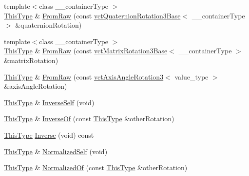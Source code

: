 \begin{DoxyCompactItemize}
\item 
{\footnotesize template$<$class \+\_\+\+\_\+container\+Type $>$ }\\\hyperlink{classvct_rodriguez_rotation3_base_add2bccab7f6e86c98b3f97fd00b06dcc}{This\+Type} \& \hyperlink{classvct_rodriguez_rotation3_base_abbc21c467e3e8ad692236b380cbdc0f3}{From\+Raw} (const \hyperlink{classvct_quaternion_rotation3_base}{vct\+Quaternion\+Rotation3\+Base}$<$ \+\_\+\+\_\+container\+Type $>$ \&quaternion\+Rotation)
\item 
{\footnotesize template$<$class \+\_\+\+\_\+container\+Type $>$ }\\\hyperlink{classvct_rodriguez_rotation3_base_add2bccab7f6e86c98b3f97fd00b06dcc}{This\+Type} \& \hyperlink{classvct_rodriguez_rotation3_base_a41b93f472a3bac59d5057f7a44476929}{From\+Raw} (const \hyperlink{classvct_matrix_rotation3_base}{vct\+Matrix\+Rotation3\+Base}$<$ \+\_\+\+\_\+container\+Type $>$ \&matrix\+Rotation)
\item 
\hyperlink{classvct_rodriguez_rotation3_base_add2bccab7f6e86c98b3f97fd00b06dcc}{This\+Type} \& \hyperlink{classvct_rodriguez_rotation3_base_ac21764b5558150331c617e998f5cc5dd}{From\+Raw} (const \hyperlink{classvct_axis_angle_rotation3}{vct\+Axis\+Angle\+Rotation3}$<$ value\+\_\+type $>$ \&axis\+Angle\+Rotation)
\item 
\hyperlink{classvct_rodriguez_rotation3_base_add2bccab7f6e86c98b3f97fd00b06dcc}{This\+Type} \& \hyperlink{classvct_rodriguez_rotation3_base_af08edcc08dee7bb319d0a4fa836fc1ff}{Inverse\+Self} (void)
\item 
\hyperlink{classvct_rodriguez_rotation3_base_add2bccab7f6e86c98b3f97fd00b06dcc}{This\+Type} \& \hyperlink{classvct_rodriguez_rotation3_base_a7e99a6439a25aecdf538af69a2277be3}{Inverse\+Of} (const \hyperlink{classvct_rodriguez_rotation3_base_add2bccab7f6e86c98b3f97fd00b06dcc}{This\+Type} \&other\+Rotation)
\item 
\hyperlink{classvct_rodriguez_rotation3_base_add2bccab7f6e86c98b3f97fd00b06dcc}{This\+Type} \hyperlink{classvct_rodriguez_rotation3_base_a6a599df940d9e3177b2905049465bbed}{Inverse} (void) const 
\item 
\hyperlink{classvct_rodriguez_rotation3_base_add2bccab7f6e86c98b3f97fd00b06dcc}{This\+Type} \& \hyperlink{classvct_rodriguez_rotation3_base_a73ea5f0cd884e6f4daf0aa9c5fe10fe6}{Normalized\+Self} (void)
\item 
\hyperlink{classvct_rodriguez_rotation3_base_add2bccab7f6e86c98b3f97fd00b06dcc}{This\+Type} \& \hyperlink{classvct_rodriguez_rotation3_base_aeb199a5055db34545f0351286a527671}{Normalized\+Of} (const \hyperlink{classvct_rodriguez_rotation3_base_add2bccab7f6e86c98b3f97fd00b06dcc}{This\+Type} \&other\+Rotation)

\end{DoxyCompactItemize}
